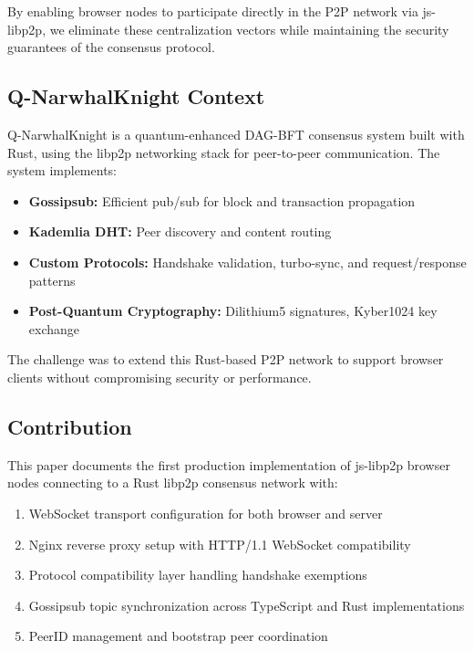 \documentclass[11pt,a4paper]{article}
\begin{document}
By enabling browser nodes to participate directly in the P2P network via js-libp2p, we eliminate these centralization vectors while maintaining the security guarantees of the consensus protocol.

\subsection{Q-NarwhalKnight Context}

Q-NarwhalKnight is a quantum-enhanced DAG-BFT consensus system built with Rust, using the libp2p networking stack for peer-to-peer communication. The system implements:

\begin{itemize}
    \item \textbf{Gossipsub:} Efficient pub/sub for block and transaction propagation
    \item \textbf{Kademlia DHT:} Peer discovery and content routing
    \item \textbf{Custom Protocols:} Handshake validation, turbo-sync, and request/response patterns
    \item \textbf{Post-Quantum Cryptography:} Dilithium5 signatures, Kyber1024 key exchange
\end{itemize}

The challenge was to extend this Rust-based P2P network to support browser clients without compromising security or performance.

\subsection{Contribution}

This paper documents the first production implementation of js-libp2p browser nodes connecting to a Rust libp2p consensus network with:

\begin{enumerate}
    \item WebSocket transport configuration for both browser and server
    \item Nginx reverse proxy setup with HTTP/1.1 WebSocket compatibility
    \item Protocol compatibility layer handling handshake exemptions
    \item Gossipsub topic synchronization across TypeScript and Rust implementations
    \item PeerID management and bootstrap peer coordination
\end{enumerate}
\end{document}
